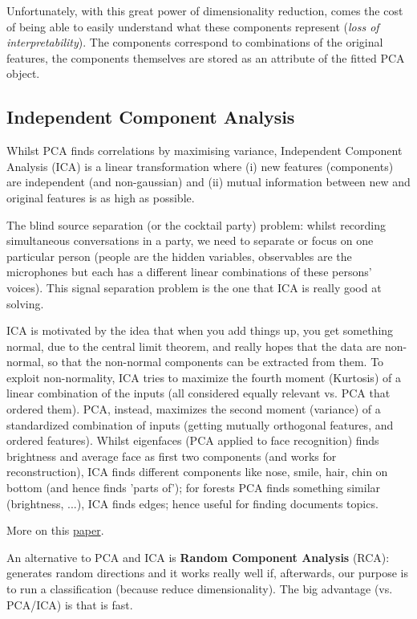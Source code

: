 \documentclass[11pt]{article}
\begin{document}
Unfortunately, with this great power of dimensionality reduction, comes the cost of being able to easily understand what these components represent (\textit{loss of interpretability}). The components correspond to combinations of the original features, the components themselves are stored as an attribute of the fitted PCA object.

\subsection{Independent Component Analysis}
Whilst PCA finds correlations by maximising variance, Independent Component Analysis (ICA) is a linear transformation where (i) new features (components) are independent (and non-gaussian) and (ii) mutual information between new and original features is as high as possible. 

The blind source separation (or the cocktail party) problem: whilst recording simultaneous conversations in a party, we need to separate or focus on one particular person (people are the hidden variables, observables are the microphones but each has a different linear combinations of these persons' voices). This signal separation problem is the one that ICA is really good at solving. 

ICA is motivated by the idea that when you add things up, you get something normal, due to the central limit theorem, and really hopes that the data are non-normal, so that the non-normal components can be extracted from them. To exploit non-normality, ICA tries to maximize the fourth moment (Kurtosis) of a linear combination of the inputs (all considered equally relevant vs. PCA that ordered them). PCA, instead, maximizes the second moment (variance) of a standardized combination of inputs (getting mutually orthogonal features, and ordered features). Whilst eigenfaces (PCA applied to face recognition) finds brightness and average face as first two components (and works for reconstruction), ICA finds different components like nose, smile, hair, chin on bottom (and hence finds 'parts of'); for forests PCA finds something similar (brightness, ...), ICA finds edges; hence useful for finding documents topics.

More on this \href{https://www.cs.helsinki.fi/u/ahyvarin/papers/NN00new.pdf}{paper}.

An alternative to PCA and ICA is \textbf{Random Component Analysis} (RCA): generates random directions and it works really well if, afterwards, our purpose is to run a classification (because reduce dimensionality). The big advantage (vs. PCA/ICA) is that is fast.
\end{document}
